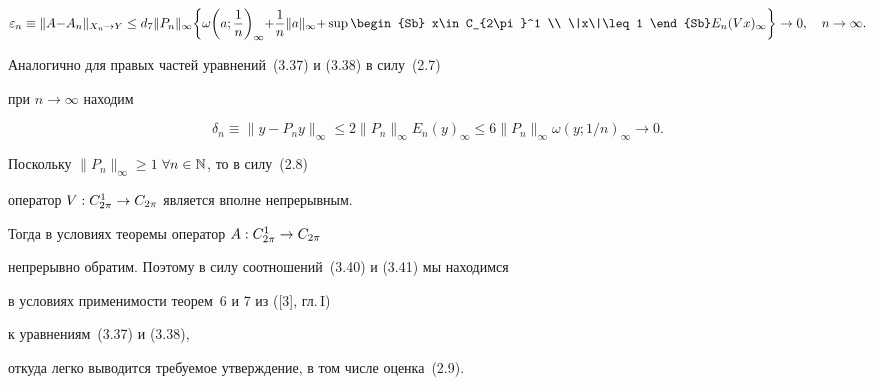 \begin{equation}


\varepsilon_n\equiv \|A{-}A_n\|_{{X_n\rightarrow Y}} \leq 


d_7 \|P_n\|_{{\infty}}\bigg\{


\omega\bigg(a;\frac{1}{n}\bigg)_{{\infty}}{+}


\frac{1}{n}\|a\|_{\infty}{+}


\sup\begin{Sb} x\in C_{2\pi}^1 \\ \|x\|\leq 1 \end{Sb}


E_n(Vx)_{{\infty}} \bigg\}


\rightarrow 0,\quad


n\rightarrow \infty .


\end{equation}





Аналогично для правых частей уравнений~(3.37) и (3.38) в силу~(2.7) 


при $n\rightarrow \infty$ находим


\begin{equation}


\delta_n\equiv \|y-P_ny\|_{{\infty}} \leq 2 \|P_n\|_{{\infty}}


E_n(y)_{{\infty}} \leq 6 \|P_n\|_{{\infty}} 


\omega(y;1/n)_{{\infty}} \rightarrow 0.


\end{equation}





Поскольку $\|P_n\|_{{\infty}} \geq 1$ $\forall n\in\Bbb N$, то в силу~(2.8)


оператор $V : C_{2\pi}^1 \to C_{2\pi}$ является вполне непрерывным.


Тогда в условиях теоремы оператор $A : C_{2\pi}^1 \to C_{2\pi}$


непрерывно обратим. Поэтому в силу соотношений~(3.40) и (3.41) мы находимся


в условиях применимости теорем~6 и 7 из ([3], гл.\,I)


к уравнениям~(3.37) и (3.38),


откуда легко выводится требуемое утверждение, в том числе оценка~(2.9).


\medskip





